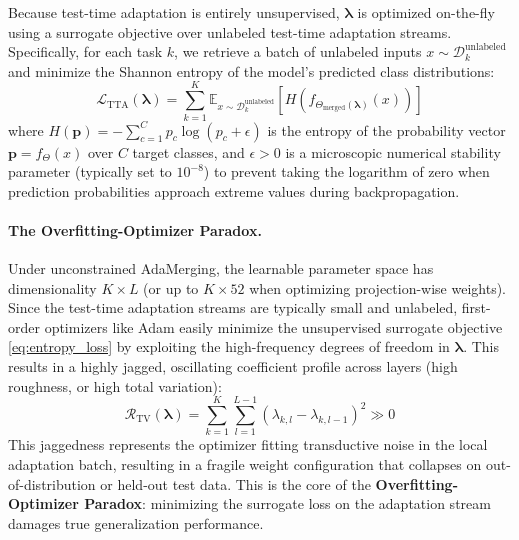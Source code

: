 Because test-time adaptation is entirely unsupervised, $\boldsymbol{\lambda}$ is optimized on-the-fly using a surrogate objective over unlabeled test-time adaptation streams. Specifically, for each task $k$, we retrieve a batch of unlabeled inputs $x \sim \mathcal{D}_k^{\text{unlabeled}}$ and minimize the Shannon entropy of the model's predicted class distributions:
\begin{equation}
\label{eq:entropy_loss}
\mathcal{L}_{\text{TTA}}(\boldsymbol{\lambda}) = \sum_{k=1}^K \mathbb{E}_{x \sim \mathcal{D}_k^{\text{unlabeled}}} \left[ H\left(f_{\Theta_{\text{merged}}(\boldsymbol{\lambda})}(x)\right) \right]
\end{equation}
where $H(\mathbf{p}) = -\sum_{c=1}^C p_c \log (p_c + \epsilon)$ is the entropy of the probability vector $\mathbf{p} = f_{\Theta}(x)$ over $C$ target classes, and $\epsilon > 0$ is a microscopic numerical stability parameter (typically set to $10^{-8}$) to prevent taking the logarithm of zero when prediction probabilities approach extreme values during backpropagation.

\paragraph{The Overfitting-Optimizer Paradox.} Under unconstrained AdaMerging, the learnable parameter space has dimensionality $K \times L$ (or up to $K \times 52$ when optimizing projection-wise weights). Since the test-time adaptation streams are typically small and unlabeled, first-order optimizers like Adam easily minimize the unsupervised surrogate objective \eqref{eq:entropy_loss} by exploiting the high-frequency degrees of freedom in $\boldsymbol{\lambda}$. This results in a highly jagged, oscillating coefficient profile across layers (high roughness, or high total variation):
\begin{equation}
\mathcal{R}_{\text{TV}}(\boldsymbol{\lambda}) = \sum_{k=1}^K \sum_{l=1}^{L-1} (\lambda_{k, l} - \lambda_{k, l-1})^2 \gg 0
\end{equation}
This jaggedness represents the optimizer fitting transductive noise in the local adaptation batch, resulting in a fragile weight configuration that collapses on out-of-distribution or held-out test data. This is the core of the \textbf{Overfitting-Optimizer Paradox}: minimizing the surrogate loss on the adaptation stream damages true generalization performance.

